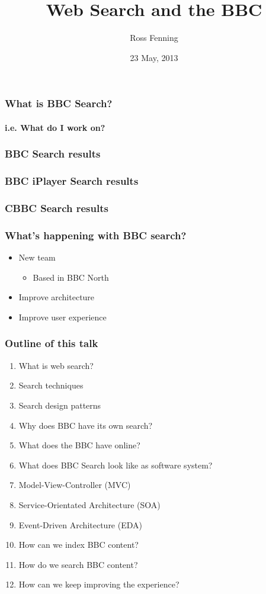 \documentclass{beamer}
\title{Web Search and the BBC}
\author{Ross Fenning}
\institute{Senior Software Engineer\\Homepage, Search and Navigation\\Future Media\\BBC}
\date{23 May, 2013}
\begin{document}
\begin{frame}[plain]
  \titlepage
\end{frame}

\begin{frame}
  \frametitle{What is BBC Search?}
  \framesubtitle{i.e. What do I work on?}
\end{frame}

\begin{frame}
  \frametitle{BBC Search results}
\end{frame}

\begin{frame}
  \frametitle{BBC iPlayer Search results}
\end{frame}

\begin{frame}
  \frametitle{CBBC Search results}
\end{frame}

\begin{frame}
  \frametitle{What's happening with BBC search?}
  \begin{itemize}
    \pause \item New team
    \begin{itemize}
    \pause \item Based in BBC North
    \end{itemize}
    \pause \item Improve architecture
    \pause \item Improve user experience
  \end{itemize}
\end{frame}

\begin{frame}
  \frametitle{Outline of this talk}
  \begin{enumerate}
    \pause \item What is web search?
    \pause \item Search techniques
    \pause \item Search design patterns
    \pause \item Why does BBC have its own search?
    \pause \item What does the BBC have online?
    \pause \item What does BBC Search look like as software system?
    \pause \item Model-View-Controller (MVC)
    \pause \item Service-Orientated Architecture (SOA)
    \pause \item Event-Driven Architecture (EDA)
    \pause \item How can we index BBC content?
    \pause \item How do we search BBC content?
    \pause \item How can we keep improving the experience?
  \end{enumerate}
\end{frame}
\end{document}

